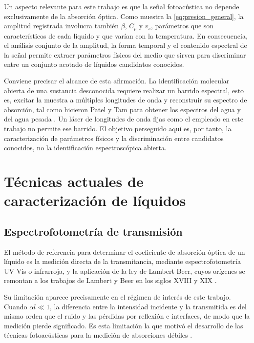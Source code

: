 Un aspecto relevante para este trabajo es que la señal fotoacústica
no depende exclusivamente de la absorción óptica. Como muestra la
\cref{eq:presion_general}, la amplitud registrada involucra también
$\beta$, $C_p$ y $v_s$, parámetros que son característicos de cada
líquido y que varían con la temperatura. En consecuencia, el
análisis conjunto de la amplitud, la forma temporal y el contenido
espectral de la señal permite extraer parámetros físicos del medio
que sirven para discriminar entre un conjunto acotado de líquidos
candidatos conocidos.

Conviene precisar el alcance de esta afirmación. La identificación
molecular abierta de una sustancia desconocida requiere realizar un
barrido espectral, esto es, excitar la muestra a múltiples
longitudes de onda y reconstruir su espectro de absorción, tal como
hicieron Patel y Tam para obtener los espectros del agua y del agua
pesada \cite{PatelTam1981}. Un láser de longitudes de onda fijas
como el empleado en este trabajo no permite ese barrido. El objetivo
perseguido aquí es, por tanto, la caracterización de parámetros
físicos y la discriminación entre candidatos conocidos, no la
identificación espectroscópica abierta.

\section{Técnicas actuales de caracterización de líquidos}
\label{sec:tecnicas_actuales}

\subsection*{Espectrofotometría de transmisión}

El método de referencia para determinar el coeficiente de absorción
óptica de un líquido es la medición directa de la transmitancia,
mediante espectrofotometría UV-Vis o infrarroja, y la aplicación de
la ley de Lambert-Beer, cuyos orígenes se remontan a los trabajos
de Lambert y Beer en los siglos XVIII y XIX \cite{Marin2008}.

Su limitación aparece precisamente en el régimen de interés de este
trabajo. Cuando $\alpha l \ll 1$, la diferencia entre la intensidad
incidente y la transmitida es del mismo orden que el ruido y las
pérdidas por reflexión e interfaces, de modo que la medición pierde
significado. Es esta limitación la que motivó el desarrollo de las
técnicas fotoacústicas para la medición de absorciones débiles
\cite{PatelTam1981}.

